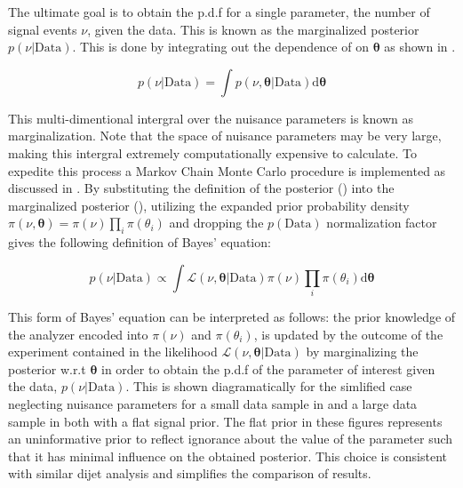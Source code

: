 The ultimate goal is to obtain the p.d.f for a single parameter, the number of
signal events $\nu$, given the data.  This is known as the marginalized
posterior $p(\nu|\text{Data})$.  This is done by integrating out the dependence
of  on $\boldsymbol{\theta}$ as shown in
.

\begin{equation} \label{eq:fit:marginalization}
p(\nu|\text{Data}) = \int p(\nu,\boldsymbol{\theta}|\text{Data})\text{d}\boldsymbol{\theta}
\end{equation}

This multi-dimentional intergral over the nuisance parameters is known as
marginalization.  Note that the space of nuisance parameters may be very large,
making this intergral extremely computationally expensive to calculate.  To
expedite this process a Markov Chain Monte Carlo procedure is implemented as
discussed in . By substituting the definition of the
posterior () into the marginalized posterior
(), utilizing the expanded prior probability
density $\pi(\nu,\boldsymbol{\theta}) = \pi(\nu)\prod_{i}\pi(\theta_i)$ and
dropping the $p(\text{Data})$ normalization factor gives the following
definition of Bayes' equation: 

\begin{equation} \label{eq:fit:bayes}
p(\nu|\text{Data}) \propto \int \mathcal{L}(\nu,\boldsymbol{\theta}|\text{Data})\pi(\nu)\prod_{i}\pi(\theta_i)\text{d}\boldsymbol{\theta}
\end{equation}

This form of Bayes' equation can be interpreted as follows: the prior knowledge
of the analyzer encoded into $\pi(\nu)$ and $\pi(\theta_{i})$, is updated by
the outcome of the experiment contained in the likelihood
$\mathcal{L}(\nu,\boldsymbol{\theta}|\text{Data})$ by marginalizing the
posterior w.r.t $\boldsymbol{\theta}$ in order to obtain the p.d.f of the
parameter of interest given the data, $p(\nu|\text{Data})$.  This is shown
diagramatically for the simlified case neglecting nuisance parameters for a
small data sample in  and a large data sample in
 both with a flat signal prior.  The flat prior in
these figures represents an uninformative prior to reflect ignorance about
the value of the parameter such that it has minimal influence on the obtained
posterior.  This choice is consistent with similar dijet analysis
\cite{Beresford:2642397} and simplifies the comparison of results.


